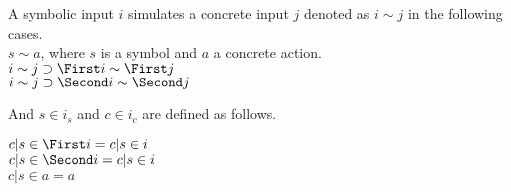 \begin{definition}
  A symbolic input $i$ simulates a concrete input $j$ denoted as $i\sim j$ in the following cases.\\
  $s\sim a$, where $s$ is a symbol and $a$ a concrete action.\\
  $i\sim j\implies \First i \sim \First j$\\
  $i\sim j\implies \Second i \sim \Second j$
\end{definition}

And $s\in i_s$ and $c\in i_c$ are defined as follows.

\begin{definition}
  $c|s\in \First i = c|s\in i $\\
  $c|s\in \Second i = c|s\in i $\\
  $c|s\in a = a $
\end{definition}
